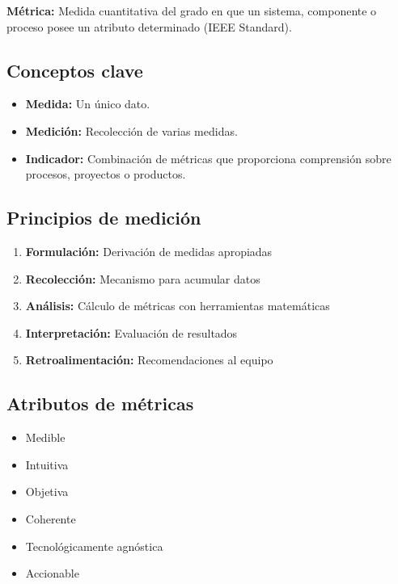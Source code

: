     \begin{definicion}
        \textbf{Métrica:} Medida cuantitativa del grado en que un sistema, componente o proceso posee un atributo determinado (IEEE Standard).
    \end{definicion}

    \subsection{Conceptos clave}\label{subsec:conceptos-clave}
    \begin{itemize}
        \item \textbf{Medida:} Un único dato.
        \item \textbf{Medición:} Recolección de varias medidas.
        \item \textbf{Indicador:} Combinación de métricas que proporciona comprensión sobre procesos, proyectos o productos.
    \end{itemize}

    \subsection{Principios de medición}\label{subsec:principios-de-medicion}
    \begin{enumerate}
        \item \textbf{Formulación:} Derivación de medidas apropiadas
        \item \textbf{Recolección:} Mecanismo para acumular datos
        \item \textbf{Análisis:} Cálculo de métricas con herramientas matemáticas
        \item \textbf{Interpretación:} Evaluación de resultados
        \item \textbf{Retroalimentación:} Recomendaciones al equipo
    \end{enumerate}

    \subsection{Atributos de métricas}\label{subsec:atributos-de-metricas}
    \begin{itemize}
        \item Medible
        \item Intuitiva
        \item Objetiva
        \item Coherente \item
        Tecnológicamente agnóstica
        \item Accionable
    \end{itemize}

